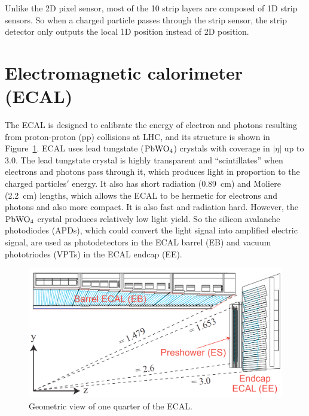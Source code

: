 Unlike the 2D pixel sensor, most of the 10 strip layers are composed of 1D strip sensors. So when a charged particle passes through the strip sensor, the strip detector only outputs the local 1D position instead of 2D position. 



\section{Electromagnetic calorimeter (ECAL) }



The ECAL is designed to calibrate the energy of electron and photons resulting from proton-proton (pp) collisions at LHC, and its structure is shown in Figure~\ref{fig:ECAL}.  
ECAL uses lead tungstate (${\rm PbWO_4}$) crystals with coverage in $|\eta|$ up to 3.0. 
The lead tungstate crystal is highly transparent and ``scintillates'' when electrons and photons pass through it, which produces light in proportion to the charged particles$'$ energy. 
It also has short radiation (0.89~cm) and Moliere (2.2~cm) lengths, which allows the ECAL to be hermetic for electrons and photons and also more compact. It is also fast and radiation hard. However, 
the ${\rm PbWO_4}$ crystal produces relatively low light yield.
So the silicon avalanche photodiodes (APDs), which could convert the light signal into amplified electric signal, are used as photodetectors in the ECAL barrel (EB) and 
vacuum phototriodes (VPTs) in the ECAL endcap (EE). 
 
 
\begin{figure}[!htbp]
\centering
\includegraphics[width=.9\textwidth]{figures/ECALEta.png}
\caption{Geometric view of one quarter of the ECAL.}
\label{fig:ECAL}
\end{figure}

